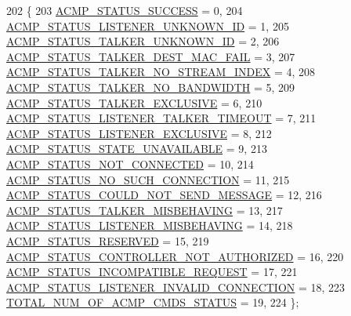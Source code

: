 \begin{DoxyCode}
202 \{
203     \hyperlink{namespaceavdecc__lib_ae0a51eed2d4dfed01460049a240d6f34a6e7347496acf3a05a9b3dab05deb8765}{ACMP\_STATUS\_SUCCESS} = 0,                    
204     \hyperlink{namespaceavdecc__lib_ae0a51eed2d4dfed01460049a240d6f34a5b51cc5fcbc55294674437198a2f67c6}{ACMP\_STATUS\_LISTENER\_UNKNOWN\_ID} = 1,        
205     \hyperlink{namespaceavdecc__lib_ae0a51eed2d4dfed01460049a240d6f34a25d8b60be9ad02e302ed0c46e9baaabf}{ACMP\_STATUS\_TALKER\_UNKNOWN\_ID} = 2,          
206     \hyperlink{namespaceavdecc__lib_ae0a51eed2d4dfed01460049a240d6f34a107ce4e8147a8752ab9449d52e39d15c}{ACMP\_STATUS\_TALKER\_DEST\_MAC\_FAIL} = 3,       
207     \hyperlink{namespaceavdecc__lib_ae0a51eed2d4dfed01460049a240d6f34aa8ff5400579c118bbc96d523c4a7b1a5}{ACMP\_STATUS\_TALKER\_NO\_STREAM\_INDEX} = 4,     
208     \hyperlink{namespaceavdecc__lib_ae0a51eed2d4dfed01460049a240d6f34a20a957ef269d966b2a2ec59e19c9edf9}{ACMP\_STATUS\_TALKER\_NO\_BANDWIDTH} = 5,        
209     \hyperlink{namespaceavdecc__lib_ae0a51eed2d4dfed01460049a240d6f34af107365cfe011609626975dc14760952}{ACMP\_STATUS\_TALKER\_EXCLUSIVE} = 6,           
210     \hyperlink{namespaceavdecc__lib_ae0a51eed2d4dfed01460049a240d6f34aa9a6f91c7d0f7c3ca22f8ce6a53d73ff}{ACMP\_STATUS\_LISTENER\_TALKER\_TIMEOUT} = 7,    
211     \hyperlink{namespaceavdecc__lib_ae0a51eed2d4dfed01460049a240d6f34aa59954390872fa67a423ac08ad8c30ab}{ACMP\_STATUS\_LISTENER\_EXCLUSIVE} = 8,         
212     \hyperlink{namespaceavdecc__lib_ae0a51eed2d4dfed01460049a240d6f34ab593add43f050a87ef74903b58d634f5}{ACMP\_STATUS\_STATE\_UNAVAILABLE} = 9,          
213     \hyperlink{namespaceavdecc__lib_ae0a51eed2d4dfed01460049a240d6f34a0bdf2c1b0839968904d946f5afb8ce40}{ACMP\_STATUS\_NOT\_CONNECTED} = 10,             
214     \hyperlink{namespaceavdecc__lib_ae0a51eed2d4dfed01460049a240d6f34a1c6ab05cc0fe2d342abcadc4d5d30bb6}{ACMP\_STATUS\_NO\_SUCH\_CONNECTION} = 11,        
215     \hyperlink{namespaceavdecc__lib_ae0a51eed2d4dfed01460049a240d6f34a05e1baac8015ae0d6527256cb58a4c8a}{ACMP\_STATUS\_COULD\_NOT\_SEND\_MESSAGE} = 12,    
216     \hyperlink{namespaceavdecc__lib_ae0a51eed2d4dfed01460049a240d6f34a4068d9848e2b7860172041ed0696aae0}{ACMP\_STATUS\_TALKER\_MISBEHAVING} = 13,        
217     \hyperlink{namespaceavdecc__lib_ae0a51eed2d4dfed01460049a240d6f34a3e368d8dcc1e29281832d12ded6ebebb}{ACMP\_STATUS\_LISTENER\_MISBEHAVING} = 14,      
218     \hyperlink{namespaceavdecc__lib_ae0a51eed2d4dfed01460049a240d6f34af18e5e90076c7264d35214eb75c805b3}{ACMP\_STATUS\_RESERVED} = 15,                  
219     \hyperlink{namespaceavdecc__lib_ae0a51eed2d4dfed01460049a240d6f34a26d25d005b758898c9dafeaf97b10d22}{ACMP\_STATUS\_CONTROLLER\_NOT\_AUTHORIZED} = 16, 
220     \hyperlink{namespaceavdecc__lib_ae0a51eed2d4dfed01460049a240d6f34a1fbc74f1ff34d3627c9247a77985f5cf}{ACMP\_STATUS\_INCOMPATIBLE\_REQUEST} = 17,      
221     \hyperlink{namespaceavdecc__lib_ae0a51eed2d4dfed01460049a240d6f34a767ab55889de65da2d1ae2bfd43bde7d}{ACMP\_STATUS\_LISTENER\_INVALID\_CONNECTION} = 18,
223     \hyperlink{namespaceavdecc__lib_ae0a51eed2d4dfed01460049a240d6f34af04f6a677604103a9f6cfa2bb82c7426}{TOTAL\_NUM\_OF\_ACMP\_CMDS\_STATUS} = 19, 
224 \};
\end{DoxyCode}
